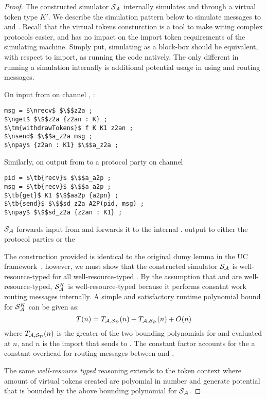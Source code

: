 \begin{proof}
The constructed simulator $\mathcal{S}_\mathcal{A}$ internally simulates \Dummysim and \Adversary through a virtual token type $K'$. 
We describe the simulation pattern below to simulate messages to \Dummysim and \Adversary.
Recall that the virtual tokens consturction is a tool to make witing complex protocols easier, and has no impact on the import token requirements of the simulating machine.
Simply put, simulating as a block-box should be equivalent, with respect to import, as \Simulator running the code natively. 
The only different in running a simulation internally is additional potential usage in using  and routing messages.

On input from \Environment on channel , \Simulator:
\begin{lstlisting}[basicstyle=\small\BeraMonottFamily, frame=single,  mathescape, label={lst:sim}]
msg = $\nrecv$ $\$$z2a ;
$\nget$ $\$$z2a {z2an : K} ;
$\tm{withdrawTokens}$ f K K1 z2an ;
$\nsend$ $\$$a_z2a msg ;
$\npay$ {z2an : K1} $\$$a_z2a ; 
\end{lstlisting}

Similarly, on output from \Adversary to a protocol party on channel 
\begin{lstlisting}[basicstyle=\small\BeraMonottFamily, frame=single,  mathescape]
pid = $\tb{recv}$ $\$$a_a2p ;
msg = $\tb{recv}$ $\$$a_a2p ;
$\tb{get}$ K1 $\$$aa2p {a2pn} ;
$\tb{send}$ $\$$sd_z2a A2P(pid, msg) ;
$\npay$ $\$$sd_z2a {z2an : K1} ;
\end{lstlisting}

$\mathcal{S}_\mathcal{A}$ forwards input from \Environment and forwards it to the internal \Adversary. 
\Adversary output to either the protocol parties or the 

The construction provided is identical to the original dumy lemma in the UC framework~\cite{uc}, however, we must show that the constructed simulator $\mathcal{S}_\mathcal{A}$ is well-resource-typed for all well-resource-typed \Adversary.
By the assumption that \Adversary and \Dummysim are well-resource-typed, $\mathcal{S}_\mathcal{A}^K$ is well-resource-typed because it performs consatnt work routing messages internally. 
A simple and satisfactory runtime polynomial bound for $\mathcal{S}_\mathcal{A}^K$ can be given as:
\[
T(n) = T_{\mathcal{A},\mathcal{S}_{\mathcal{D}}}(n) + T_{\mathcal{A},\mathcal{S}_{\mathcal{D}}}(n) + O(n)
\]
where $T_{\mathcal{A},\mathcal{S}_{\mathcal{D}}}(n)$ is the greater of the two bounding polynomials for \Dummysim and \Adversary evaluated at $n$, and $n$ is the import that \Environment sends to \Adversary. 
The constant factor accounts for the a constant overhead for routing messages between \Dummysim and \Adversary.

The same \textit{well-resource typed} reasoning extends to the token context where amount of virtual tokens created are polyomial in number and generate potential that is bounded by the above bounding polynomial for $\mathcal{S}_\mathcal{A}$.

\end{proof}


